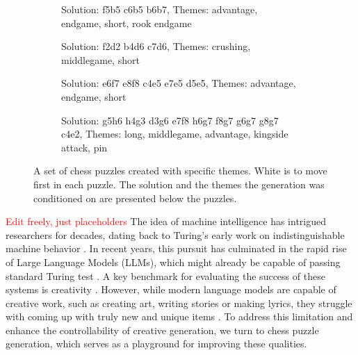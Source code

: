 \documentclass[letterpaper]{article} %
\begin{document}
\begin{figure}[t]
    \begin{subfigure}[t]{0.23\textwidth}
        \centering
        \chessboard[
            setfen=6k1/7p/pPp1P1pP/P4R2/6p1/r7/4r3/1K5R w - - 0 43,
            showmover=true, %
            boardfontsize=12pt
        ]
        \caption{Solution: f5b5 c6b5 b6b7, Themes: advantage, endgame, short, rook endgame}
        \label{fig:final puzzle1}
    \end{subfigure}
    \hfill
    \centering
    \begin{subfigure}[t]{0.23\textwidth}
        \centering
        \chessboard[
            setfen=r1b2k1r/2B1ppb1/p4np1/1p5p/1q3Pn1/PBN5/2P2QPP/3R1R1K w - - 1 22,
            showmover=true, %
            boardfontsize=12pt
        ]
        \caption{Solution: f2d2 b4d6 c7d6, Themes: crushing, middlegame, short}
        \label{fig:final puzzle2}
    \end{subfigure}
    \hfill
    \begin{subfigure}[t]{0.23\textwidth}
        \centering
        \chessboard[
            setfen=2r1k3/4qpp1/1p2P2p/pP1Q1p2/2Np4/P1r2R2/2P3P1/7K w - - 1 34,
            showmover=true, %
            boardfontsize=12pt
        ]
        \caption{Solution: e6f7 e8f8 c4e5 e7e5 d5e5, Themes: advantage, endgame, short}
        \label{fig:final puzzle3}
    \end{subfigure}
    \hfill
    \begin{subfigure}[t]{0.23\textwidth}
        \centering
        \chessboard[
            setfen=6k1/1bp1qpb1/3r1p1p/pp4P1/2BB1P1p/1P1Q1PR1/P1P1r3/1K1R4 w - - 0 23,
            showmover=true, %
            boardfontsize=12pt
        ]
        \caption{Solution: g5h6 h4g3 d3g6 e7f8 h6g7 f8g7 g6g7 g8g7 c4e2, Themes: long, middlegame, advantage, kingside attack, pin}
        \label{fig:final puzzle4}
    \end{subfigure}
    \caption{A set of chess puzzles created with specific themes. White is to move first in each puzzle. The solution and the themes the generation was conditioned on are presented below the puzzles.}
    \label{fig:final puzzles}
\end{figure}


\textcolor{red}{Edit freely, just placeholders}
The idea of machine intelligence has intrigued researchers for decades, dating back to Turing's early work on indistinguishable machine behavior \cite{turing1950computingmachineryandintelligence}. In recent years, this pursuit has culminated in the rapid rise of Large Language Models (LLMs), which might already be capable of passing standard Turing test \cite{jones2026largelanguagemodelspassastandardthreepartyturingtest}. A key benchmark for evaluating the success of these systems is creativity \cite{colton2012computationalcreativity}. However, while modern language models are capable of creative work, such as creating art, writing stories or making lyrics, they struggle with coming up with truly new and unique items \cite{wenger2026llmsarehomogenouslycreative}. To address this limitation and enhance the controllability of creative generation, we turn to chess puzzle generation, which serves as a playground for improving these qualities.
\end{document}
